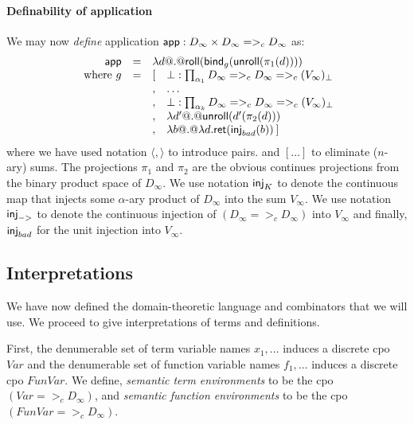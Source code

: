 \documentclass[preprint,nocopyrightspace]{sigplanconf}
\begin{document}
\paragraph{Definability of application}
We may now {\em define} application $\mathsf{app} : D_\infty \times D_\infty =>_c D_\infty$ as: 
{\setlength{\arraycolsep}{2pt}
\[\begin{array}{rcll}
   \dapp & = & \multicolumn{2}{l}{\dlambda d @.@ \roll(\bind_g (\unroll (\pi_1(d))))} \\
   \text{ where } g & = &  [ & \bot : \prod_{\ar_1}{D_\infty} =>_c D_\infty =>_c (V_\infty)_\bot \\
                    &   &  , & \ldots \\
                    &   &  , & \bot : \prod_{\ar_k}{D_\infty} =>_c D_\infty =>_c (V_\infty)_\bot \\
                    &   &  , & \dlambda d' @.@ \unroll(d'(\pi_2(d))) \\
                    &   &  , & \dlambda b @.@ \dlambda d. \ret(\inj{bad}(b))\hspace{2pt} ] 
\end{array}\]}%
where we have used notation $\langle , \rangle$ to introduce pairs. and $[\ldots]$ to eliminate ($n$-ary) sums.
The projections $\pi_1$ and $\pi_2$ are the obvious continues projections from the binary product space of $D_{\infty}$. 
We use notation $\mathsf{inj}_{K}$ to denote the continuous map that injects some $\alpha$-ary product of $D_{\infty}$ into the sum $V_{\infty}$.
We use notation $\mathsf{inj}_{->}$ to denote the continuous injection of $(D_{\infty} =>_c D_{\infty})$ into $V_{\infty}$ and finally, 
$\mathsf{inj}_{bad}$ for the unit injection into $V_{\infty}$.


\subsection{Interpretations}
\newcommand{\VarCpo}{\textit{Var}}
\newcommand{\FVarCpo}{\textit{FunVar}}
\newcommand{\interp}[3]{[\![#1]\!]_{\langle {#2},{#3}\rangle}}
\newcommand{\dbrace}[1]{[\![#1]\!]}


We have now defined the domain-theoretic language and combinators that we will use. 
We proceed to give interpretations of terms and definitions. 

First, the denumerable set of term variable names $x_1,\ldots$ induces a discrete 
cpo $\VarCpo$  and the denumerable set of function variable names $f_1,\ldots$ induces a discrete 
cpo $\FVarCpo$. We define, {\em semantic term environments} to be the cpo $(\VarCpo =>_c D_{\infty})$, 
and {\em semantic function environments} to be the cpo $(\FVarCpo =>_c D_{\infty})$. 
\end{document}
